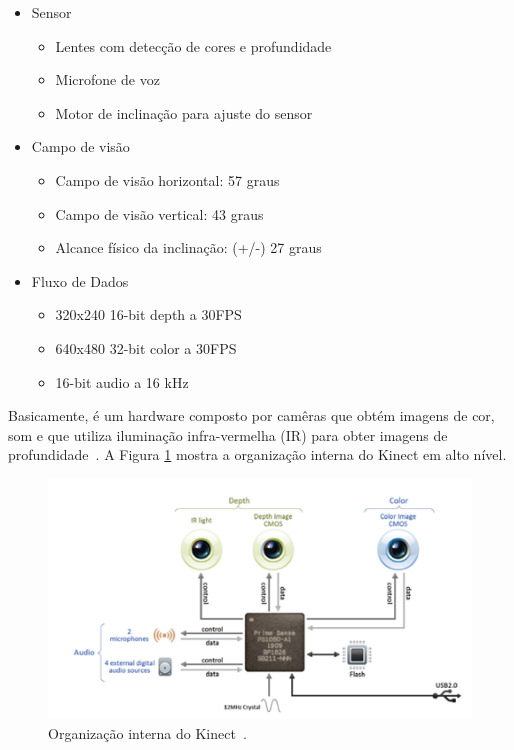 	\begin{itemize}
		\item Sensor
			\begin{itemize}
				\item Lentes com detecção de cores e profundidade
				\item Microfone de voz
				\item Motor de inclinação para ajuste do sensor
			\end{itemize}
		\item Campo de visão
			\begin{itemize}
				\item Campo de visão horizontal: 57 graus
				\item Campo de visão vertical: 43 graus
				\item Alcance físico da inclinação: (+/-) 27 graus
			\end{itemize}
		\item Fluxo de Dados
			\begin{itemize}
				\item 320x240 16-bit depth a 30FPS
				\item 640x480 32-bit color a 30FPS
				\item 16-bit audio a 16 kHz
			\end{itemize}
	\end{itemize}

Basicamente, é um hardware composto por camêras que obtém imagens de cor, som e que utiliza iluminação infra-vermelha (IR) para obter imagens de profundidade~\cite{kinect}. A Figura \ref{kinect_interno} mostra a organização interna do Kinect em alto nível.

	\begin{figure}[hbt]
		\begin{center}
			\includegraphics[scale=0.8]{figuras/2.FundamentacaoTeorica/kinect_interno.png}
		\end{center}
		\caption{Organização interna do Kinect~\cite{kinect}.}
		\label{kinect_interno}
	\end{figure}

